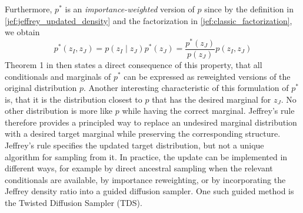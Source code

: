 Furthermore, $p^*$ is an \textit{importance-weighted} version of $p$ since by the definition in \eqref{jef:jeffrey_updated_density} and the factorization in \eqref{jef:classic_factorization}, we obtain
\begin{equation}
	p^*(z_I, z_J) = p(z_I \mid z_J)p^*(z_J) = \frac{p^*(z_J)}{p(z_J)}p(z_I, z_J)
\end{equation}
Theorem 1 in \cite{MatteiJeffreysRule} then states a direct consequence of this property, that all conditionals and marginals of $p^*$ can be expressed as reweighted versions of the original distribution $p$.
Another interesting characteristic of this formulation of $p^*$ is, that it is the distribution closest to $p$ that has the desired marginal for $z_J$. No other distribution is more like $p$ while having the correct marginal. Jeffrey's rule therefore provides a principled way to replace an undesired marginal distribution with a desired target marginal while preserving the corresponding structure. Jeffrey's rule specifies the updated target distribution, but not a unique algorithm for sampling from it. In practice, the update can be implemented in different ways, for example by direct ancestral sampling when the relevant conditionals are available, by importance reweighting, or by incorporating the Jeffrey density ratio into a guided diffusion sampler. One such guided method is the Twisted Diffusion Sampler (TDS).
